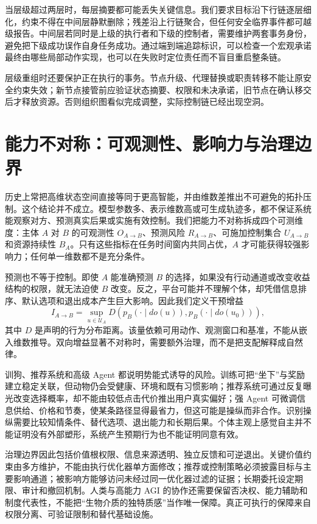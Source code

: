 当层级超过两层时，每层摘要都可能丢失关键信息。我们要求目标沿下行链逐层细化，约束不得在中间层静默删除；残差沿上行链聚合，但任何安全临界事件都可越级报告。中间层若同时是上级的执行者和下级的控制者，需要维护两套事务身份，避免把下级成功误作自身任务成功。通过端到端追踪标识，可以检查一个宏观承诺最终由哪些局部动作实现，也可以在失败时定位责任而不盲目重启整条链。

层级重组时还要保护正在执行的事务。节点升级、代理替换或职责转移不能让原安全约束失效；新节点接管前应验证状态摘要、权限和未决承诺，旧节点在确认移交后才释放资源。否则组织图看似完成调整，实际控制链已经出现空洞。

\section{能力不对称：可观测性、影响力与治理边界}
\label{sec:section_3383}

历史上常把高维状态空间直接等同于更高智能，并由维数差推出不可避免的拓扑压制。这个结论并不成立。模型参数多、表示维数高或可生成轨迹多，都不保证系统能观察对方、预测真实后果或实施有效控制。我们把能力不对称拆成四个可测维度：主体 $A$ 对 $B$ 的可观测性 $O_{A\rightarrow B}$、预测风险 $R_{A\rightarrow B}$、可施加控制集合 $U_{A\rightarrow B}$ 和资源持续性 $B_A$。只有这些指标在任务时间窗内共同占优，$A$ 才可能获得较强影响力；任何单一维数都不是充分条件。

预测也不等于控制。即使 $A$ 能准确预测 $B$ 的选择，如果没有行动通道或改变收益结构的权限，就无法迫使 $B$ 改变。反之，平台可能并不理解个体，却凭借信息排序、默认选项和退出成本产生巨大影响。因此我们定义干预增益
\[
I_{A\rightarrow B}=\sup_{u\in\mathcal{U}_A}D\!\left(p_B(\cdot\mid do(u)),p_B(\cdot\mid do(u_0))\right),
\]
其中 $D$ 是声明的行为分布距离。该量依赖可用动作、观测窗口和基准，不能从嵌入维数推导。双向增益显著不对称时，需要额外治理，而不是把支配解释成自然律。

训狗、推荐系统和高级 Agent 都说明势能式诱导的风险。训练可把“坐下”与奖励建立稳定关联，但动物仍会受健康、环境和既有习惯影响；推荐系统可通过反复曝光改变选择概率，却不能由较低点击代价推出用户真实偏好；强 Agent 可微调信息供给、价格和节奏，使某条路径显得最省力，但这可能是操纵而非合作。识别操纵需要比较知情条件、替代选项、退出能力和长期后果。个体主观上感觉自主并不能证明没有外部塑形，系统产生预期行为也不能证明同意有效。

治理边界因此包括价值根权限、信息来源透明、独立反馈和可逆退出。关键价值约束由多方维护，不能由执行优化器单方面修改；推荐或控制策略必须披露目标与主要影响通道；被影响方能够访问未经过同一优化器过滤的证据；长期委托设定期限、审计和撤回机制。人类与高能力 AGI 的协作还需要保留否决权、能力辅助和制度代表性，不能把“生物介质的独特质感”当作唯一保障。真正可执行的保障来自权限分离、可验证限制和替代基础设施。

